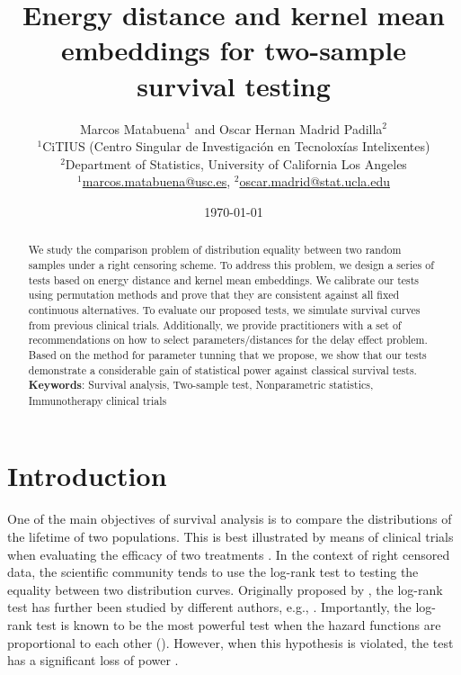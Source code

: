 \documentclass[11pt]{article}
\date{\vspace{-5ex}}
\author{Marcos Matabuena$^{1}$ and Oscar Hernan Madrid Padilla$^{2}$ \\
		$^{1}$CiTIUS (Centro Singular de Investigaci\'{o}n en Tecnolox\'{i}as Intelixentes) \\  $^{2}$Department of Statistics, University of California Los Angeles \\
	$^{1}$\url{marcos.matabuena@usc.es}, $^{2}$\url{oscar.madrid@stat.ucla.edu}}
\title{Energy distance and kernel mean embeddings for two-sample survival testing}
\date{\today}
\begin{document}
\maketitle
\begin{abstract}
We study the comparison problem  of  distribution equality between two random samples under a right censoring scheme. To address this problem,  we design a series of tests based on  energy distance and kernel mean embeddings. We calibrate our tests using permutation methods and prove that they are consistent against all fixed continuous
alternatives. To evaluate our proposed  tests, we simulate survival curves from previous clinical trials. Additionally, we provide practitioners with a set of recommendations on how to select parameters/distances for the delay effect problem.  Based on the method for parameter tunning that we propose, we show that our tests demonstrate a considerable gain of statistical power against classical survival tests. 
	\vskip 5mm
	\textbf{Keywords}:
	Survival analysis, Two-sample test, Nonparametric statistics,  Immunotherapy clinical trials 
\end{abstract}

\section{Introduction}
 One of the main objectives of survival analysis is to compare the distributions of  the lifetime of two populations. This is best illustrated by means of clinical trials when evaluating the efficacy of two treatments \cite{biblsingh2011survival}. In the context of right censored data, the scientific community tends to use the log-rank test  to testing the equality between two distribution curves. Originally  proposed by \cite{mantel1959statistical}, the log-rank test  has further been studied  by different  authors, e.g.,  \cite{schoenfeld1981asymptotic,fleming2011counting}. Importantly,  the   log-rank test is known to be the most powerful test when the hazard functions are proportional to each other (\cite{schoenfeld1981asymptotic}). However, when this hypothesis is violated, the test has a significant loss of power \cite{fleming1980modified,lachin1986evaluation,lakatos1988sample,schoenfeld1981asymptotic}. 
 
  
  
\end{document}
